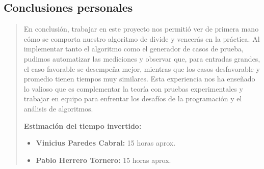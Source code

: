 \documentclass[12pt,a4paper]{article}
\begin{document}
\subsection{Conclusiones personales}
\begin{quote}
En conclusión, trabajar en este proyecto nos permitió ver de primera mano cómo se comporta nuestro algoritmo de divide y vencerás en la práctica. Al implementar tanto el algoritmo como el generador de casos de prueba, pudimos automatizar las mediciones y observar que, para entradas grandes, el caso favorable se desempeña mejor, mientras que los casos desfavorable y promedio tienen tiempos muy similares. Esta experiencia nos ha enseñado lo valioso que es complementar la teoría con pruebas experimentales y trabajar en equipo para enfrentar los desafíos de la programación y el análisis de algoritmos. 

\textbf{Estimación del tiempo invertido:}
\begin{itemize}
    \item \textbf{Vinicius Paredes Cabral:} 15 horas aprox.
    \item \textbf{Pablo Herrero Tornero:} 15 horas aprox.
\end{itemize}
\end{quote}
\end{document}
